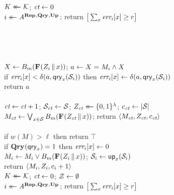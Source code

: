 \begin{figure*}[t]
{
  \vspace{-7pt}
  \\[2pt]
    $\key \getsr \keys$;
    $\ct \gets 0$\\
    $i \getsr \advA^{\REPO,\QRYO,\UPO}$;
    return $\big[\sum_x \err_i[x] \geq r\big]$
  \\[6pt]
  \hfill{}\\[2pt]
    \\
  \\[6pt]
  \\[2pt]
    $X \gets \bmap_m(\PRFO(\salt_i \cat x))$;
    $a \gets X = M_i \AND X$\\
    if $\err_i[x] < \delta(a,\qry_x(\col_i))$ then
          $\err_i[x] \gets \delta(a,\qry_x(\col_i))$\\
    return $a$
  \\[6pt]
  \oraclev{$\REPO(\col)$}\\[2pt]
    $\ct \gets \ct+1$;
    $\setS_{\ct} \gets \col$;
    $\salt_{\ct} \getsr \bits^\lambda$;
    $c_{\ct} \gets |\col|$\\
    $M_{\ct} \gets \bigvee_{x \in \col} \bmap_m(\PRFO(\salt_{\ct} \cat x))$;
    return $\langle M_{\ct}, \salt_{\ct}, c_{\ct} \rangle$
  \\[6pt]
  \\[2pt]
    if $w(M) > \ell$ then return $\top$\\
    if $\QRYO(\qry_x) = 1$ then $\err_i[x] \gets 0$\\
    $M_i \gets M_i \vee \bmap_m(\PRFO(\salt_i \cat x))$;
    $\setS_i \gets \up_x(\setS_i)$\\
    return $\langle M_i, \salt_i, c_i+1\rangle$
}
{
  \vspace{-7pt}
  \hfill{}\\[2pt]
    $\key \getsr \keys$;
    $\ct \gets 0$;
    $\setZ \gets \emptyset$\\
    $i \getsr \advA^{\REPO,\QRYO,\UPO}$;
    return $\big[\sum_x \err_i[x] \geq r\big]$
  \\[6pt]
  \oraclev{$\REPO(\col)$}\\[2pt]
}
\end{figure*}
